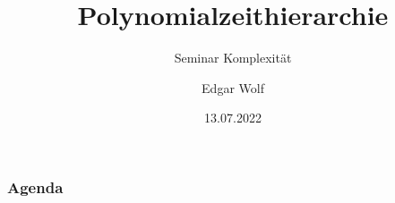 \documentclass{beamer}
\title{Polynomialzeithierarchie}
\subtitle{Seminar Komplexität}
\author{Edgar Wolf}
\institute{Hochschule Kempten}
\date{13.07.2022}
\theoremstyle{plain}
\theoremstyle{plain}
\begin{document}
\begin{frame}
    \titlepage
\end{frame}

\begin{frame}
    \frametitle{Agenda}
    \tableofcontents
\end{frame}






\end{document}
